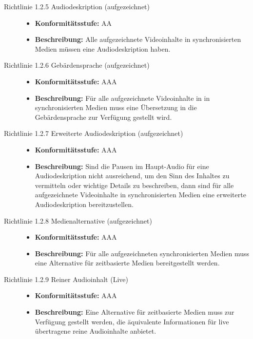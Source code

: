 \begin{description}
\begin{description}
		\item[Richtlinie 1.2.5 Audiodeskription (aufgezeichnet)]\hfill
		\begin{itemize}
			\item \textbf{Konformitätsstufe:} AA
			\item \textbf{Beschreibung:} Alle aufgezeichnete Videoinhalte in synchronisierten Medien müssen eine Audiodeskription haben.
		\end{itemize}
			
		\item[Richtlinie 1.2.6 Gebärdensprache (aufgezeichnet)]\hfill
		\begin{itemize}
			\item \textbf{Konformitätsstufe:} AAA
			\item \textbf{Beschreibung:} Für alle aufgezeichnete Videoinhalte in in synchronisierten Medien muss eine Übersetzung in die Gebärdensprache zur 
			Verfügung gestellt wird.
		\end{itemize}
			
		\item[Richtlinie 1.2.7 Erweiterte Audiodeskription (aufgezeichnet)]\hfill
		\begin{itemize}
			\item \textbf{Konformitätsstufe:} AAA
			\item \textbf{Beschreibung:} Sind die Pausen im Haupt-Audio für eine Audiodeskription nicht ausreichend, um den Sinn des Inhaltes zu vermitteln oder 
			wichtige Details zu beschreiben, dann sind für alle aufgezeichnete Videoinhalte in synchronisierten Medien eine erweiterte 
			Audiodeskription bereitzustellen.
		\end{itemize}
			
		\item[Richtlinie 1.2.8 Medienalternative (aufgezeichnet)]\hfill
		\begin{itemize}
			\item \textbf{Konformitätsstufe:} AAA
			\item \textbf{Beschreibung:} Für alle aufgezeichneten synchronisierten Medien muss eine Alternative für zeitbasierte Medien bereitgestellt werden.
		\end{itemize}
			
		\item[Richtlinie 1.2.9 Reiner Audioinhalt (Live)]\hfill
		\begin{itemize}
			\item \textbf{Konformitätsstufe:} AAA
			\item \textbf{Beschreibung:} Eine Alternative für zeitbasierte Medien muss zur Verfügung gestellt werden, die äquivalente Informationen 
			für live übertragene reine Audioinhalte anbietet.
		\end{itemize}
			

\end{description}
\end{description}
